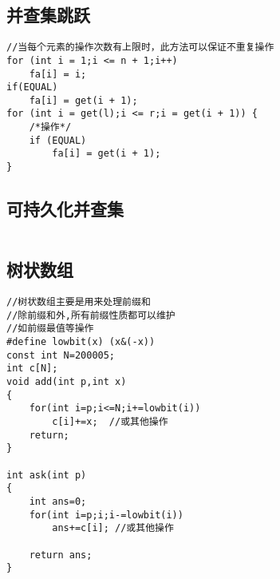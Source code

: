 \documentclass[twocolumn,a4]{article}
\begin{document}
\subsection{并查集跳跃}
\begin{lstlisting}
//当每个元素的操作次数有上限时，此方法可以保证不重复操作
for (int i = 1;i <= n + 1;i++)
    fa[i] = i;
if(EQUAL)
    fa[i] = get(i + 1);
for (int i = get(l);i <= r;i = get(i + 1)) {
    /*操作*/
    if (EQUAL)
        fa[i] = get(i + 1);
}
\end{lstlisting}

\subsection{可持久化并查集}
\begin{lstlisting}

\end{lstlisting}

\subsection{树状数组}
\begin{lstlisting}
//树状数组主要是用来处理前缀和
//除前缀和外,所有前缀性质都可以维护
//如前缀最值等操作
#define lowbit(x) (x&(-x))
const int N=200005;
int c[N];
void add(int p,int x)
{
    for(int i=p;i<=N;i+=lowbit(i))
        c[i]+=x;  //或其他操作
    return;
}

int ask(int p)
{
    int ans=0;
    for(int i=p;i;i-=lowbit(i))
        ans+=c[i]; //或其他操作

    return ans;
}
\end{lstlisting}
\end{document}
